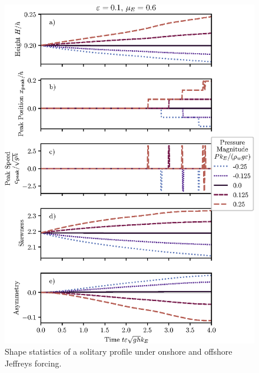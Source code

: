 \documentclass{jfm}
\begin{document}
\begin{figure}
  \centering
  \includegraphics{Skew-Asymm.eps}
  \caption{
    Shape statistics of a solitary profile under onshore and offshore
    Jeffreys forcing.
  }
\end{figure}
\end{document}
